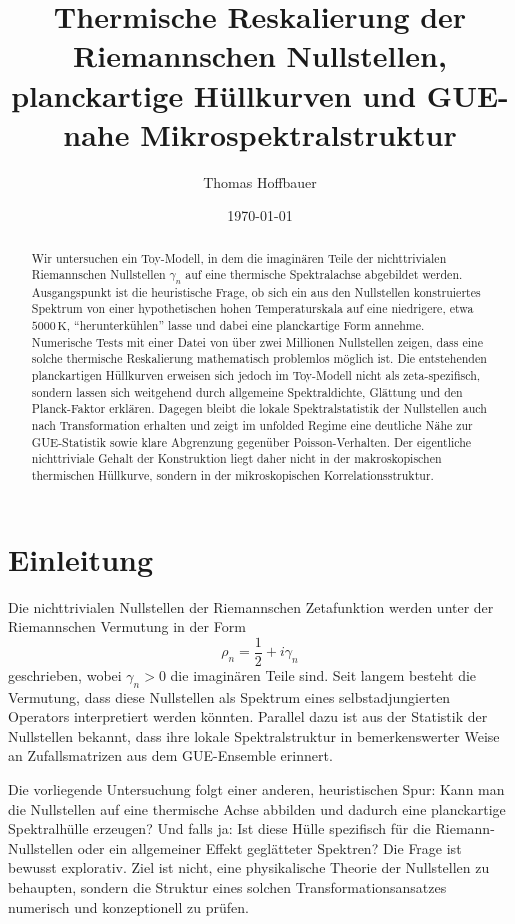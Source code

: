 \documentclass[11pt,a4paper]{article}
\title{\textbf{Thermische Reskalierung der Riemannschen Nullstellen,\\
		planckartige Hüllkurven und GUE-nahe Mikrospektralstruktur}}
\author{Thomas Hoffbauer}
\date{\today}
\theoremstyle{definition}
\theoremstyle{remark}
\begin{document}
	
	\maketitle
	
	\begin{abstract}
		Wir untersuchen ein Toy-Modell, in dem die imaginären Teile der nichttrivialen Riemannschen Nullstellen $\gamma_n$ auf eine thermische Spektralachse abgebildet werden. Ausgangspunkt ist die heuristische Frage, ob sich ein aus den Nullstellen konstruiertes Spektrum von einer hypothetischen hohen Temperaturskala auf eine niedrigere, etwa $5000\,\mathrm{K}$, ``herunterkühlen'' lasse und dabei eine planckartige Form annehme. Numerische Tests mit einer Datei von über zwei Millionen Nullstellen zeigen, dass eine solche thermische Reskalierung mathematisch problemlos möglich ist. Die entstehenden planckartigen Hüllkurven erweisen sich jedoch im Toy-Modell nicht als zeta-spezifisch, sondern lassen sich weitgehend durch allgemeine Spektraldichte, Glättung und den Planck-Faktor erklären. Dagegen bleibt die lokale Spektralstatistik der Nullstellen auch nach Transformation erhalten und zeigt im unfolded Regime eine deutliche Nähe zur GUE-Statistik sowie klare Abgrenzung gegenüber Poisson-Verhalten. Der eigentliche nichttriviale Gehalt der Konstruktion liegt daher nicht in der makroskopischen thermischen Hüllkurve, sondern in der mikroskopischen Korrelationsstruktur.
	\end{abstract}
	
	\section{Einleitung}
	
	Die nichttrivialen Nullstellen der Riemannschen Zetafunktion werden unter der Riemannschen Vermutung in der Form
	\[
	\rho_n=\frac12+i\gamma_n
	\]
	geschrieben, wobei $\gamma_n>0$ die imaginären Teile sind. Seit langem besteht die Vermutung, dass diese Nullstellen als Spektrum eines selbstadjungierten Operators interpretiert werden könnten. Parallel dazu ist aus der Statistik der Nullstellen bekannt, dass ihre lokale Spektralstruktur in bemerkenswerter Weise an Zufallsmatrizen aus dem GUE-Ensemble erinnert.
	
	Die vorliegende Untersuchung folgt einer anderen, heuristischen Spur: Kann man die Nullstellen auf eine thermische Achse abbilden und dadurch eine planckartige Spektralhülle erzeugen? Und falls ja: Ist diese Hülle spezifisch für die Riemann-Nullstellen oder ein allgemeiner Effekt geglätteter Spektren? Die Frage ist bewusst explorativ. Ziel ist nicht, eine physikalische Theorie der Nullstellen zu behaupten, sondern die Struktur eines solchen Transformationsansatzes numerisch und konzeptionell zu prüfen.
	
\end{document}
